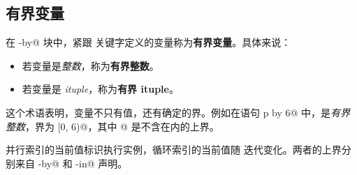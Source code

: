 \subsection*{有界变量}

在 \co@parallel-by@ 块中，紧跟 \co@parallel@ 关键字定义的变量称为\textbf{有界变量}。具体来说：

\begin{itemize}[leftmargin=1.6em]
\item 若变量是\emph{整数}，称为\textbf{有界整数}。
\item 若变量是 \emph{ituple}，称为\textbf{有界 ituple}。
\end{itemize}

这个术语表明，变量不只有值，还有确定的界。例如在语句 \co@parallel p by 6@ 中，\co@p@ 是\emph{有界整数}，界为 \co@[0, 6)@，其中 @ 是不含在内的上界。

并行索引的当前值标识执行实例，循环索引的当前值随 \co@foreach@ 迭代变化。两者的上界分别来自 \co@parallel-by@ 和 \co@with-in@ 声明。

